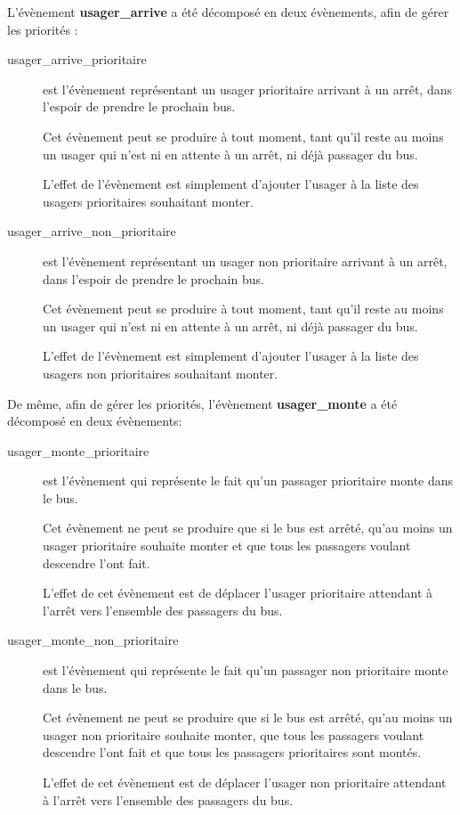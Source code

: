 \documentclass[a4paper,titlepage]{report}
\begin{document}
		L'évènement \textbf{usager\_arrive} a été décomposé en deux évènements, afin de gérer les priorités :
		\begin{description}
			\item[usager\_arrive\_prioritaire] est l'évènement représentant un usager prioritaire arrivant à un arrêt, dans l'espoir de prendre le prochain bus.
			
			Cet évènement peut se produire à tout moment, tant qu'il reste au moins un usager qui n'est ni en attente à un arrêt, ni déjà passager du bus.
			
			L'effet de l'évènement est simplement d'ajouter l'usager à la liste des usagers prioritaires souhaitant monter.
			
			\item[usager\_arrive\_non\_prioritaire] est l'évènement représentant un usager non prioritaire arrivant à un arrêt, dans l'espoir de prendre le prochain bus.
			
			Cet évènement peut se produire à tout moment, tant qu'il reste au moins un usager qui n'est ni en attente à un arrêt, ni déjà passager du bus.
			
			L'effet de l'évènement est simplement d'ajouter l'usager à la liste des usagers non prioritaires souhaitant monter.\\
		\end{description}
		

		De même, afin de gérer les priorités, l'évènement \textbf{usager\_monte} a été décomposé en deux évènements:
		
		\begin{description}
			\item[usager\_monte\_prioritaire] est l'évènement qui représente le fait qu'un passager prioritaire monte dans le bus.
			
			Cet évènement ne peut se produire que si le bus est arrêté, qu'au moins un usager prioritaire souhaite monter et que tous les passagers voulant descendre l'ont fait.
			
			L'effet de cet évènement est de déplacer l'usager prioritaire attendant à l'arrêt vers l'ensemble des passagers du bus.\\
			
			\item[usager\_monte\_non\_prioritaire] est l'évènement qui représente le fait qu'un passager non prioritaire monte dans le bus.
			
			Cet évènement ne peut se produire que si le bus est arrêté, qu'au moins un usager non prioritaire souhaite monter, que tous les passagers voulant descendre l'ont fait et que tous les passagers prioritaires sont montés.
			
			L'effet de cet évènement est de déplacer l'usager non prioritaire attendant à l'arrêt vers l'ensemble des passagers du bus.\\
		\end{description}
		
\end{document}
